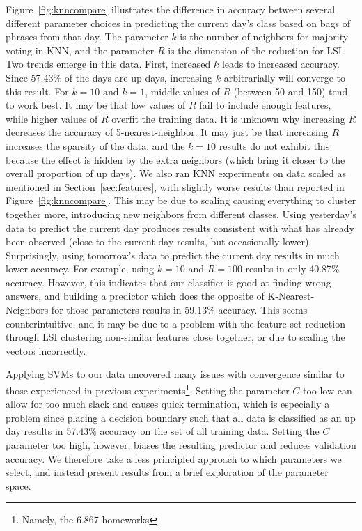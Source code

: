 \documentclass[10pt, twocolumn]{article}
\begin{document}
Figure~\ref{fig:knncompare} illustrates the difference in accuracy between several different parameter choices in predicting the current day's class based on bags of phrases from that day. The parameter $k$ is the number of neighbors for majority-voting in KNN, and the parameter $R$ is the dimension of the reduction for LSI. Two trends emerge in this data. First, increased $k$ leads to increased accuracy. Since 57.43\% of the days are up days, increasing $k$ arbitrarially will converge to this result. For $k=10 \text{ and } k=1$, middle values of $R$ (between 50 and 150) tend to work best. It may be that low values of $R$ fail to include enough features, while higher values of $R$ overfit the training data. It is unknown why increasing $R$ decreases the accuracy of 5-nearest-neighbor. It may just be that increasing $R$ increases the sparsity of the data, and the $k=10$ results do not exhibit this because the effect is hidden by the extra neighbors (which bring it closer to the overall proportion of up days). We also ran KNN experiments on data scaled as mentioned in Section~\ref{sec:features}, with slightly worse results than reported in Figure~\ref{fig:knncompare}. This may be due to scaling causing everything to cluster together more, introducing new neighbors from different classes. Using yesterday's data to predict the current day produces results consistent with what has already been observed (close to the current day results, but occasionally lower). Surprisingly, using tomorrow's data to predict the current day results in much lower accuracy. For example, using $k=10$ and $R=100$ results in only 40.87\% accuracy. However, this indicates that our classifier is good at finding wrong answers, and building a predictor which does the opposite of K-Nearest-Neighbors for those parameters results in 59.13\% accuracy. This seems counterintuitive, and it may be due to a problem with the feature set reduction through LSI clustering non-similar features close together, or due to scaling the vectors incorrectly.

Applying SVMs to our data uncovered many issues with convergence similar to those experienced in previous experiments\footnote{Namely, the 6.867 homeworks}. Setting the parameter $C$ too low can allow for too much slack and causes quick termination, which is especially a problem since placing a decision boundary such that all data is classified as an up day results in 57.43\% accuracy on the set of all training data. Setting the $C$ parameter too high, however, biases the resulting predictor and reduces validation accuracy. We therefore take a less principled approach to which parameters we select, and instead present results from a brief exploration of the parameter space.
\end{document}
